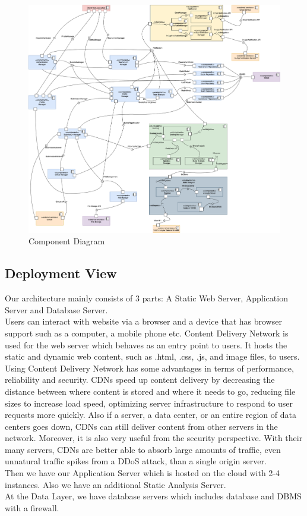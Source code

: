 \begin{figure}[H]
    \centering
    \includegraphics[width=\linewidth]{Images/DD-component.drawio.png}
    \caption{Component Diagram}
\end{figure}



\newpage
\subsection{Deployment View}
Our architecture mainly consists of 3 parts:  A Static Web Server, Application Server and Database Server.
\\
\indent Users can interact with website via a browser and a device that has browser support such as a computer, a mobile phone etc. Content Delivery Network is used for the web server which behaves as an entry point to users. It hosts the static and dynamic web content, such as .html, .css, .js, and image files, to users. Using Content Delivery Network has some advantages in terms of performance, reliability and security. CDNs speed up content delivery by decreasing the distance between where content is stored and where it needs to go, reducing file sizes to increase load speed, optimizing server infrastructure to respond to user requests more quickly. Also  if a server, a data center, or an entire region of data centers goes down, CDNs can still deliver content from other servers in the network. Moreover, it is also very useful from the security perspective. With their many servers, CDNs are better able to absorb large amounts of traffic, even unnatural traffic spikes from a DDoS attack, than a single origin server.
\\
\indent Then we have our Application Server which is hosted on the cloud with 2-4 instances. Also we have an additional Static Analysis Server.
\\
\indent At the Data Layer, we have database servers which includes database and DBMS with a firewall. 


